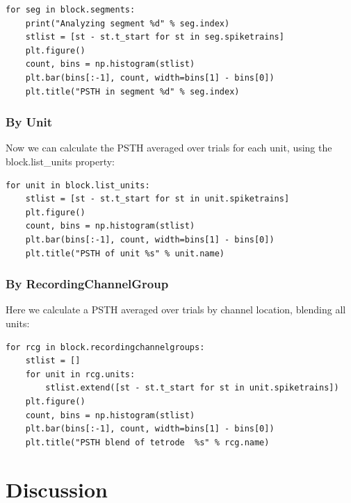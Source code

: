 \documentclass{frontiers}
\begin{document}
\begin{lstlisting}[style=display]
for seg in block.segments:
    print("Analyzing segment %d" % seg.index)
    stlist = [st - st.t_start for st in seg.spiketrains]
    plt.figure()
    count, bins = np.histogram(stlist)
    plt.bar(bins[:-1], count, width=bins[1] - bins[0])
    plt.title("PSTH in segment %d" % seg.index)
\end{lstlisting}

\subsubsection{By Unit}

Now we can calculate the PSTH averaged over trials for each unit, using the block.list\_units property:

\begin{lstlisting}[style=display]
for unit in block.list_units:
    stlist = [st - st.t_start for st in unit.spiketrains]
    plt.figure()
    count, bins = np.histogram(stlist)
    plt.bar(bins[:-1], count, width=bins[1] - bins[0])
    plt.title("PSTH of unit %s" % unit.name)
\end{lstlisting}


\subsubsection{By RecordingChannelGroup}
Here we calculate a PSTH averaged over trials by channel location, blending all units:
\begin{lstlisting}[style=display]
for rcg in block.recordingchannelgroups:
    stlist = []
    for unit in rcg.units:
        stlist.extend([st - st.t_start for st in unit.spiketrains])
    plt.figure()
    count, bins = np.histogram(stlist)
    plt.bar(bins[:-1], count, width=bins[1] - bins[0])
    plt.title("PSTH blend of tetrode  %s" % rcg.name)
\end{lstlisting}



\section{Discussion}

\end{document}
